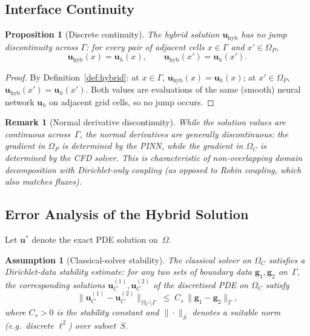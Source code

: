 \documentclass[11pt]{article}
\newtheorem{proposition}[theorem]{Proposition}
\newtheorem{remark}[theorem]{Remark}
\newtheorem{assumption}[theorem]{Assumption}
\begin{document}
\subsection{Interface Continuity}

\begin{proposition}[Discrete continuity]\label{prop:continuity}
The hybrid solution $\mathbf{u}_{\mathrm{hyb}}$ has no jump discontinuity across
$\Gamma$: for every pair of adjacent cells $x \in \Gamma$ and $x' \in \Omega_P$,
\begin{equation}\label{eq:no-jump}
  \mathbf{u}_{\mathrm{hyb}}(x) = \mathbf{u}_h(x), \qquad
  \mathbf{u}_{\mathrm{hyb}}(x') = \mathbf{u}_h(x').
\end{equation}
\end{proposition}

\begin{proof}
By Definition~\ref{def:hybrid}: at $x \in \Gamma$,
$\mathbf{u}_{\mathrm{hyb}}(x) = \mathbf{u}_h(x)$; at $x' \in \Omega_P$,
$\mathbf{u}_{\mathrm{hyb}}(x') = \mathbf{u}_h(x')$.  Both values are evaluations of
the same (smooth) neural network $\mathbf{u}_h$ on adjacent grid cells, so no jump
occurs.
\end{proof}

\begin{remark}[Normal derivative discontinuity]\label{rem:normal-deriv}
While the solution values are continuous across~$\Gamma$, the \emph{normal derivatives}
are generally discontinuous: the gradient in $\Omega_P$ is determined by the PINN, while
the gradient in $\Omega_C$ is determined by the CFD solver.  This is characteristic of
non-overlapping domain decomposition with Dirichlet-only coupling (as opposed to
Robin coupling, which also matches fluxes).
\end{remark}

\subsection{Error Analysis of the Hybrid Solution}

Let $\mathbf{u}^*$ denote the exact PDE solution on~$\Omega$.

\begin{assumption}[Classical-solver stability]\label{ass:stability}
The classical solver on $\Omega_C$ satisfies a Dirichlet-data stability estimate:
for any two sets of boundary data $\mathbf{g}_1, \mathbf{g}_2$ on~$\Gamma$, the
corresponding solutions $\mathbf{u}_C^{(1)}, \mathbf{u}_C^{(2)}$ of the discretised
PDE on $\Omega_C$ satisfy
\begin{equation}\label{eq:stability}
  \bigl\|\mathbf{u}_C^{(1)} - \mathbf{u}_C^{(2)}\bigr\|_{\Omega_C \setminus \Gamma}
  \;\le\; C_s\,\bigl\|\mathbf{g}_1 - \mathbf{g}_2\bigr\|_\Gamma,
\end{equation}
where $C_s > 0$ is the stability constant and $\|\cdot\|_S$ denotes a suitable
norm (e.g.\ discrete $\ell^2$) over subset~$S$.
\end{assumption}
\end{document}
